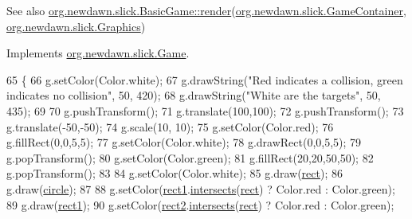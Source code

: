 \begin{DoxySeeAlso}{See also}
\mbox{\hyperlink{interfaceorg_1_1newdawn_1_1slick_1_1_game_af1a4670d43eb3ba04dfcf55ab1975b64}{org.\+newdawn.\+slick.\+Basic\+Game\+::render}}(\mbox{\hyperlink{classorg_1_1newdawn_1_1slick_1_1_game_container}{org.\+newdawn.\+slick.\+Game\+Container}}, \mbox{\hyperlink{classorg_1_1newdawn_1_1slick_1_1_graphics}{org.\+newdawn.\+slick.\+Graphics}}) 
\end{DoxySeeAlso}


Implements \mbox{\hyperlink{interfaceorg_1_1newdawn_1_1slick_1_1_game_af1a4670d43eb3ba04dfcf55ab1975b64}{org.\+newdawn.\+slick.\+Game}}.


\begin{DoxyCode}
65                                                             \{
66         g.setColor(Color.white);
67         g.drawString(\textcolor{stringliteral}{"Red indicates a collision, green indicates no collision"}, 50, 420);
68         g.drawString(\textcolor{stringliteral}{"White are the targets"}, 50, 435);
69 
70         g.pushTransform();
71         g.translate(100,100);
72         g.pushTransform();
73         g.translate(-50,-50);
74         g.scale(10, 10);
75         g.setColor(Color.red);
76         g.fillRect(0,0,5,5);
77         g.setColor(Color.white);
78         g.drawRect(0,0,5,5);
79         g.popTransform();
80         g.setColor(Color.green);
81         g.fillRect(20,20,50,50);
82         g.popTransform();
83         
84         g.setColor(Color.white);
85         g.draw(\mbox{\hyperlink{classorg_1_1newdawn_1_1slick_1_1tests_1_1_geom_test_a758ee9c95f74edec4a31bc3b8e303cde}{rect}});
86         g.draw(\mbox{\hyperlink{classorg_1_1newdawn_1_1slick_1_1tests_1_1_geom_test_adb8595b3dd3956c9885a33c2851b0a84}{circle}});
87         
88         g.setColor(\mbox{\hyperlink{classorg_1_1newdawn_1_1slick_1_1tests_1_1_geom_test_a2d04438f8f41827e625babf80383948d}{rect1}}.\mbox{\hyperlink{classorg_1_1newdawn_1_1slick_1_1geom_1_1_shape_a5726456feb401f1cbd443b3f1faf0d40}{intersects}}(\mbox{\hyperlink{classorg_1_1newdawn_1_1slick_1_1tests_1_1_geom_test_a758ee9c95f74edec4a31bc3b8e303cde}{rect}}) ? Color.red : Color.green);
89         g.draw(\mbox{\hyperlink{classorg_1_1newdawn_1_1slick_1_1tests_1_1_geom_test_a2d04438f8f41827e625babf80383948d}{rect1}});
90         g.setColor(\mbox{\hyperlink{classorg_1_1newdawn_1_1slick_1_1tests_1_1_geom_test_a6fb3662ef49d1cb417105d0e507a61cc}{rect2}}.\mbox{\hyperlink{classorg_1_1newdawn_1_1slick_1_1geom_1_1_shape_a5726456feb401f1cbd443b3f1faf0d40}{intersects}}(\mbox{\hyperlink{classorg_1_1newdawn_1_1slick_1_1tests_1_1_geom_test_a758ee9c95f74edec4a31bc3b8e303cde}{rect}}) ? Color.red : Color.green);

\end{DoxyCode}
